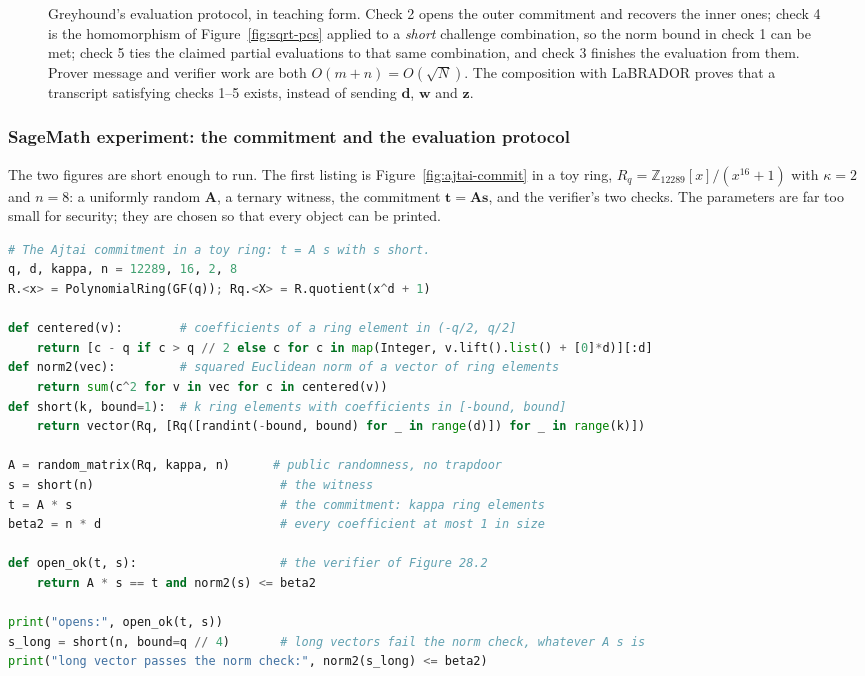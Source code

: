 \begin{figure}[H]
\begin{protocol}
\begin{tabular}{@{}p{0.34\linewidth}@{}p{0.26\linewidth}@{}p{0.40\linewidth}@{}}
\end{tabular}
\end{protocol}
\caption{Greyhound's evaluation protocol, in teaching form. Check 2 opens the
outer commitment and recovers the inner ones; check 4 is the homomorphism of
Figure~\ref{fig:sqrt-pcs} applied to a \emph{short} challenge combination, so
the norm bound in check 1 can be met; check 5 ties the claimed partial
evaluations to that same combination, and check 3 finishes the evaluation from
them. Prover message and verifier work are both $O(m+n)=O(\sqrt{N})$. The
composition with LaBRADOR proves that a transcript satisfying checks 1--5
exists, instead of sending $\mathbf{d}$, $\mathbf{w}$ and $\mathbf{z}$.}
\label{fig:greyhound-eval}
\end{figure}

\subsubsection{SageMath experiment: the commitment and the evaluation protocol}
The two figures are short enough to run. The first listing is
Figure~\ref{fig:ajtai-commit} in a toy ring, $R_q=\mathbb{Z}_{12289}[x]/(x^{16}+1)$
with $\kappa=2$ and $n=8$: a uniformly random $\mathbf{A}$, a ternary witness,
the commitment $\mathbf{t}=\mathbf{A}\mathbf{s}$, and the verifier's two checks.
The parameters are far too small for security; they are chosen so that every
object can be printed.

\begin{lstlisting}[language=Python]
# The Ajtai commitment in a toy ring: t = A s with s short.
q, d, kappa, n = 12289, 16, 2, 8
R.<x> = PolynomialRing(GF(q)); Rq.<X> = R.quotient(x^d + 1)

def centered(v):        # coefficients of a ring element in (-q/2, q/2]
    return [c - q if c > q // 2 else c for c in map(Integer, v.lift().list() + [0]*d)][:d]
def norm2(vec):         # squared Euclidean norm of a vector of ring elements
    return sum(c^2 for v in vec for c in centered(v))
def short(k, bound=1):  # k ring elements with coefficients in [-bound, bound]
    return vector(Rq, [Rq([randint(-bound, bound) for _ in range(d)]) for _ in range(k)])

A = random_matrix(Rq, kappa, n)      # public randomness, no trapdoor
s = short(n)                          # the witness
t = A * s                             # the commitment: kappa ring elements
beta2 = n * d                         # every coefficient at most 1 in size

def open_ok(t, s):                    # the verifier of Figure 28.2
    return A * s == t and norm2(s) <= beta2

print("opens:", open_ok(t, s))
s_long = short(n, bound=q // 4)       # long vectors fail the norm check, whatever A s is
print("long vector passes the norm check:", norm2(s_long) <= beta2)
\end{lstlisting}

